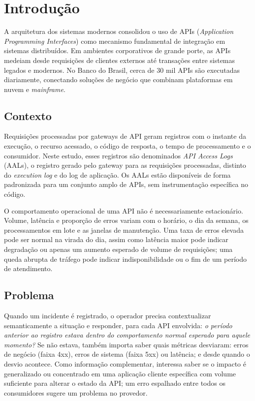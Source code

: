 \documentclass[sigconf,nonacm]{acmart}
\begin{document}
\maketitle

\section{Introdução}

A arquitetura dos sistemas modernos consolidou o uso de APIs (\emph{Application Programming Interfaces}) como mecanismo fundamental de integração em sistemas distribuídos. Em ambientes corporativos de grande porte, as APIs medeiam desde requisições de clientes externos até transações entre sistemas legados e modernos. No Banco do Brasil, cerca de 30 mil APIs são executadas diariamente, conectando soluções de negócio que combinam plataformas em nuvem e \emph{mainframe}.

\subsection{Contexto}

Requisições processadas por gateways de API geram registros com o instante da execução, o recurso acessado, o código de resposta, o tempo de processamento e o consumidor. Neste estudo, esses registros são denominados \emph{API Access Logs} (AALs), o registro gerado pelo gateway para as requisições processadas, distinto do \emph{execution log} e do log de aplicação. Os AALs estão disponíveis de forma padronizada para um conjunto amplo de APIs, sem instrumentação específica no código.

O comportamento operacional de uma API não é necessariamente estacionário. Volume, latência e proporção de erros variam com o horário, o dia da semana, os processamentos em lote e as janelas de manutenção. Uma taxa de erros elevada pode ser normal na virada do dia, assim como latência maior pode indicar degradação ou apenas um aumento esperado de volume de requisições; uma queda abrupta de tráfego pode indicar indisponibilidade ou o fim de um período de atendimento.

\subsection{Problema}
Quando um incidente é registrado, o operador precisa contextualizar semanticamente a situação e responder, para cada API envolvida: \emph{o período anterior ao registro estava dentro do comportamento normal esperado para aquele momento?} Se não estava, também importa saber quais métricas desviaram: erros de negócio (faixa 4xx), erros de sistema (faixa 5xx) ou latência; e desde quando o desvio acontece. Como informação complementar, interessa saber se o impacto é generalizado ou concentrado em uma aplicação cliente específica com volume suficiente para alterar o estado da API; um erro espalhado entre todos os consumidores sugere um problema no provedor.
\end{document}
